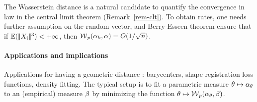 \begin{rem}
The Wasserstein distance is a natural candidate to quantify the convergence in law in the central limit theorem (Remark~\ref{rem-clt}). To obtain rates, one needs further assumption on the random vector, and Berry-Esseen theorem ensure that if $\mathbb{E}(|\!| X_i |\!|^3)<+\infty$, then $\operatorname{\mathcal{W}}_p(\alpha_k,\alpha) = O(1/\sqrt{n})$.
\end{rem}
 
 
\paragraph{Applications and implications}

Applications for having a geometric distance : barycenters, shape registration loss functions, density fitting.
%
The typical setup is to fit a parametric measure $\theta \mapsto \alpha_\theta$ to an (empirical) measure $\beta$ by minimizing the function $\theta \mapsto \operatorname{\mathcal{W}}_p(\alpha_\theta,\beta)$.



